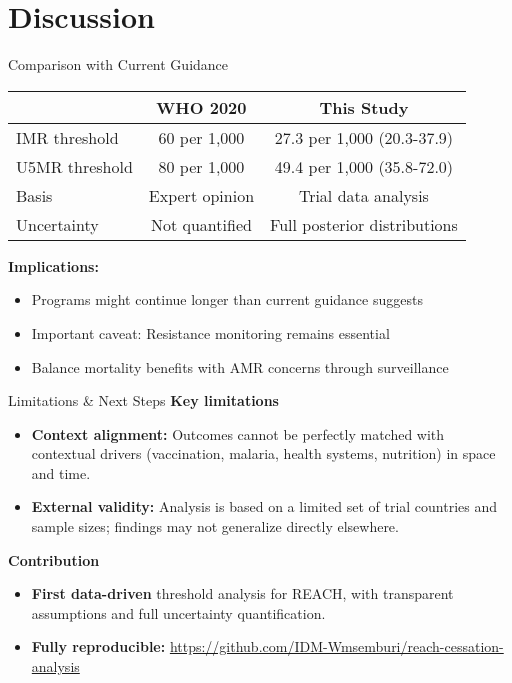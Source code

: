 \documentclass[aspectratio=169]{beamer}\usepackage[]{graphicx}\usepackage[dvipsnames]{xcolor}
\begin{document}
\section{Discussion}

\begin{frame}{Comparison with Current Guidance}
\begin{center}
\begin{tabular}{lcc}
\toprule
& \textbf{WHO 2020} & \textbf{This Study} \\
\midrule
IMR threshold & 60 per 1,000 & 27.3 per 1,000 (20.3-37.9) \\
U5MR threshold & 80 per 1,000 & 49.4 per 1,000 (35.8-72.0) \\
Basis & Expert opinion & Trial data analysis \\
Uncertainty & Not quantified & Full posterior distributions \\
\bottomrule
\end{tabular}
\end{center}

\vspace{0.5cm}
\textbf{Implications:}
\begin{itemize}
  \item Programs might continue longer than current guidance suggests
  \item Important caveat: Resistance monitoring remains essential
  \item Balance mortality benefits with AMR concerns through surveillance
\end{itemize}
\end{frame}

\begin{frame}{Limitations \& Next Steps}
\textbf{Key limitations}
\begin{itemize}
  \item \textbf{Context alignment:} Outcomes cannot be perfectly matched with contextual drivers (vaccination, malaria, health systems, nutrition) in space and time.
  \item \textbf{External validity:} Analysis is based on a limited set of trial countries and sample sizes; findings may not generalize directly elsewhere.
\end{itemize}

\vspace{0.35em}
\textbf{Contribution}
\begin{itemize}
  \item \textbf{First data-driven} threshold analysis for REACH, with transparent assumptions and full uncertainty quantification.
  \item \textbf{Fully reproducible:} \url{https://github.com/IDM-Wmsemburi/reach-cessation-analysis}
\end{itemize}

\end{frame}
\end{document}

